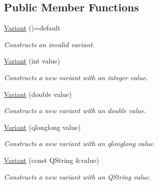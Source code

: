 \subsection*{Public Member Functions}
\begin{DoxyCompactItemize}
\item 
\mbox{\label{class_variant_a594b84b7c7a7e997aac3354bbdaa2d97}} 
\hyperlink{class_variant_a594b84b7c7a7e997aac3354bbdaa2d97}{Variant} ()=default
\begin{DoxyCompactList}\small\item\em Constructs an invalid variant. \end{DoxyCompactList}\item 
\mbox{\label{class_variant_a1015564e64eb9bc9ce894fb1f98b6e36}} 
\hyperlink{class_variant_a1015564e64eb9bc9ce894fb1f98b6e36}{Variant} (int value)
\begin{DoxyCompactList}\small\item\em Constructs a new variant with an integer value. \end{DoxyCompactList}\item 
\mbox{\label{class_variant_a7e7d9a46e166e059ce75b76b92b11457}} 
\hyperlink{class_variant_a7e7d9a46e166e059ce75b76b92b11457}{Variant} (double value)
\begin{DoxyCompactList}\small\item\em Constructs a new variant with an double value. \end{DoxyCompactList}\item 
\mbox{\label{class_variant_a6f86cea152e761f48700e41f210fe251}} 
\hyperlink{class_variant_a6f86cea152e761f48700e41f210fe251}{Variant} (qlonglong value)
\begin{DoxyCompactList}\small\item\em Constructs a new variant with an qlonglong value. \end{DoxyCompactList}\item 
\mbox{\label{class_variant_a2a2d8b7cc035142a795f86d481adde0c}} 
\hyperlink{class_variant_a2a2d8b7cc035142a795f86d481adde0c}{Variant} (const Q\+String \&value)
\begin{DoxyCompactList}\small\item\em Constructs a new variant with an Q\+String value. \end{DoxyCompactList}\end{DoxyCompactItemize}



